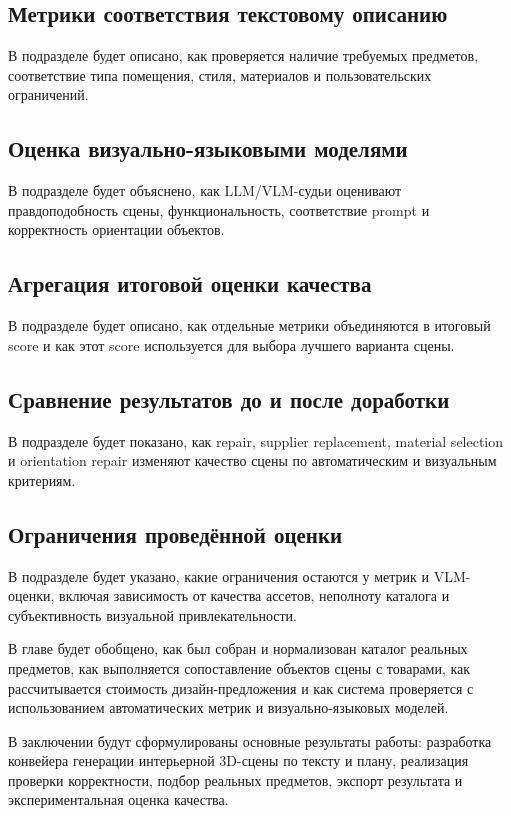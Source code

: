 \documentclass[times]{itmo-student-thesis}
\begin{document}
\subsection{Метрики соответствия текстовому описанию}
В подразделе будет описано, как проверяется наличие требуемых предметов, соответствие типа помещения, стиля, материалов и пользовательских ограничений.

\subsection{Оценка визуально-языковыми моделями}
В подразделе будет объяснено, как LLM/VLM-судьи оценивают правдоподобность сцены, функциональность, соответствие prompt и корректность ориентации объектов.

\subsection{Агрегация итоговой оценки качества}
В подразделе будет описано, как отдельные метрики объединяются в итоговый score и как этот score используется для выбора лучшего варианта сцены.

\subsection{Сравнение результатов до и после доработки}
В подразделе будет показано, как repair, supplier replacement, material selection и orientation repair изменяют качество сцены по автоматическим и визуальным критериям.

\subsection{Ограничения проведённой оценки}
В подразделе будет указано, какие ограничения остаются у метрик и VLM-оценки, включая зависимость от качества ассетов, неполноту каталога и субъективность визуальной привлекательности.

\chapterconclusion

В главе будет обобщено, как был собран и нормализован каталог реальных предметов, как выполняется сопоставление объектов сцены с товарами, как рассчитывается стоимость дизайн-предложения и как система проверяется с использованием автоматических метрик и визуально-языковых моделей.

\startconclusionpage

В заключении будут сформулированы основные результаты работы: разработка конвейера генерации интерьерной 3D-сцены по тексту и плану, реализация проверки корректности, подбор реальных предметов, экспорт результата и экспериментальная оценка качества.

\nocite{itmo-student-thesis}
\printmainbibliography
\end{document}
